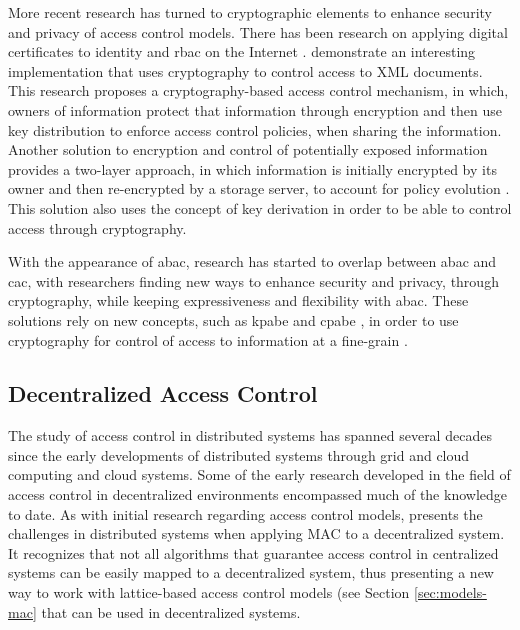 More recent research has turned to cryptographic elements to enhance security and privacy of access control models. There has been research on applying digital certificates to identity \cite{park_binding_2000} and \gls{rbac} on the Internet \cite{park_rbac_1999}. \citeauthor{miklau_controlling_2003} \cite{miklau_controlling_2003} demonstrate an interesting implementation that uses cryptography to control access to XML documents. This research proposes a cryptography-based access control mechanism, in which, owners of information protect that information through encryption and then use key distribution to enforce access control policies, when sharing the information. Another solution to encryption and control of potentially exposed information provides a two-layer approach, in which information is initially encrypted by its owner and then re-encrypted by a storage server, to account for policy evolution \cite{di_vimercati_over-encryption:_2007}. This solution also uses the concept of key derivation in order to be able to control access through cryptography.

With the appearance of \gls{abac}, research has started to overlap between \gls{abac} and \gls{cac}, with researchers finding new ways to enhance security and privacy, through cryptography, while keeping expressiveness and flexibility with \gls{abac}. These solutions rely on new concepts, such as \gls{kpabe} \cite{goyal_attribute-based_2006} and \gls{cpabe} \cite{bethencourt_ciphertext-policy_2007}, in order to use cryptography for control of access to information at a fine-grain \cite{wan_hasbe:_2012, ruj_privacy_2012, wang_hierarchical_2010}.

\subsection{Decentralized Access Control}

The study of access control in distributed systems has spanned several decades since the early developments of distributed systems through grid and cloud computing and cloud systems. Some of the early research developed in the field of access control in decentralized environments \cite{karger_non-discretionary_1977} encompassed much of the knowledge to date. As with initial research regarding access control models, \citeauthor{karger_non-discretionary_1977} \cite{karger_non-discretionary_1977} presents the challenges in distributed systems when applying MAC to a decentralized system. It recognizes that not all algorithms that guarantee access control in centralized systems can be easily mapped to a decentralized system, thus presenting a new way to work with lattice-based access control models (see Section \ref{sec:models-mac} that can be used in decentralized systems.

